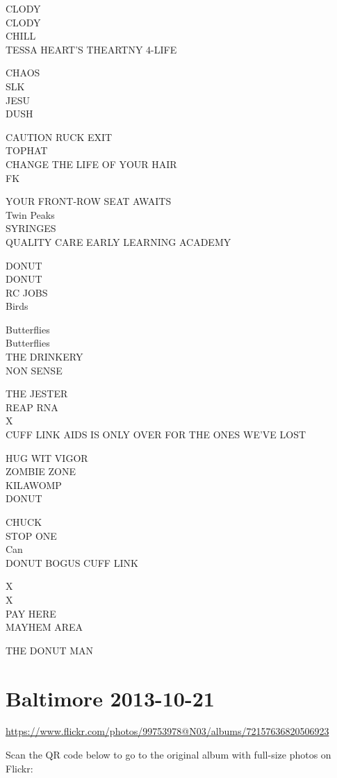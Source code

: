 \documentclass[10pt,letterpaper]{article}
\begin{document}
CLODY\\
CLODY\\
CHILL\\
TESSA HEART'S THEARTNY 4{-}LIFE

CHAOS\\
SLK\\
JESU\\
DUSH

CAUTION RUCK EXIT\\
TOPHAT\\
CHANGE THE LIFE OF YOUR HAIR\\
FK

YOUR FRONT{-}ROW SEAT AWAITS\\
Twin Peaks\\
SYRINGES\\
QUALITY CARE EARLY LEARNING ACADEMY

DONUT\\
DONUT\\
RC JOBS\\
Birds

Butterflies\\
Butterflies\\
THE DRINKERY\\
NON SENSE

THE JESTER\\
REAP RNA\\
X\\
CUFF LINK AIDS IS ONLY OVER FOR THE ONES WE'VE LOST

HUG WIT VIGOR\\
ZOMBIE ZONE\\
KILAWOMP\\
DONUT

CHUCK\\
STOP ONE\\
Can\\
DONUT BOGUS CUFF LINK

X\\
X\\
PAY HERE\\
MAYHEM AREA

THE DONUT MAN


\section*{Baltimore 2013-10-21}

\url{https://www.flickr.com/photos/99753978@N03/albums/72157636820506923}

Scan the QR code below to go to the original album with full-size photos on Flickr:
\end{document}
